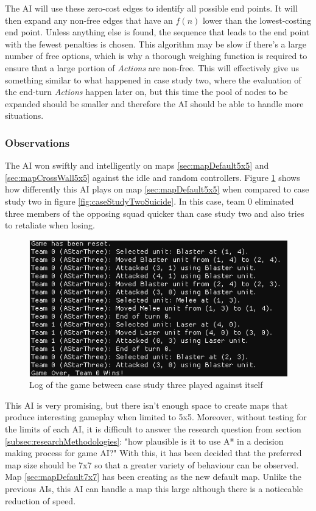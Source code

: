 \documentclass[11pt, a4paper]{report}
\begin{document}
The AI will use these zero-cost edges to identify all possible end points. It will then expand any non-free edges that have an $f(n)$ lower than the lowest-costing end point. Unless anything else is found, the sequence that leads to the end point with the fewest penalties is chosen. This algorithm may be slow if there's a large number of free options, which is why a thorough weighing function is required to ensure that a large portion of \emph{Actions} are non-free. This will effectively give us something similar to what happened in case study two, where the evaluation of the end-turn \emph{Actions} happen later on, but this time the pool of nodes to be expanded should be smaller and therefore the AI should be able to handle more situations.

\subsubsection{Observations}

The AI won swiftly and intelligently on maps \ref{sec:mapDefault5x5} and \ref{sec:mapCrossWall5x5} against the idle and random controllers. Figure \ref{fig:caseStudyThreeGame} shows how differently this AI plays on map \ref{sec:mapDefault5x5} when compared to case study two in figure \ref{fig:caseStudyTwoSuicide}. In this case, team 0 eliminated three members of the opposing squad quicker than case study two and also tries to retaliate when losing.

\begin{figure}[!h]
  \centering
  \includegraphics[width=12cm]{img/case_three_game.png}
  \caption{Log of the game between case study three played against itself}
  \label{fig:caseStudyThreeGame}
\end{figure}

This AI is very promising, but there isn't enough space to create maps that produce interesting gameplay when limited to 5x5. Moreover, without testing for the limits of each AI, it is difficult to answer the research question from section \ref{subsec:researchMethodologies}: "how plausible is it to use A* in a decision making process for game AI?" With this, it has been decided that the preferred map size should be 7x7 so that a greater variety of behaviour can be observed. Map \ref{sec:mapDefault7x7} has been creating as the new default map. Unlike the previous AIs, this AI can handle a map this large although there is a noticeable reduction of speed.
\end{document}
